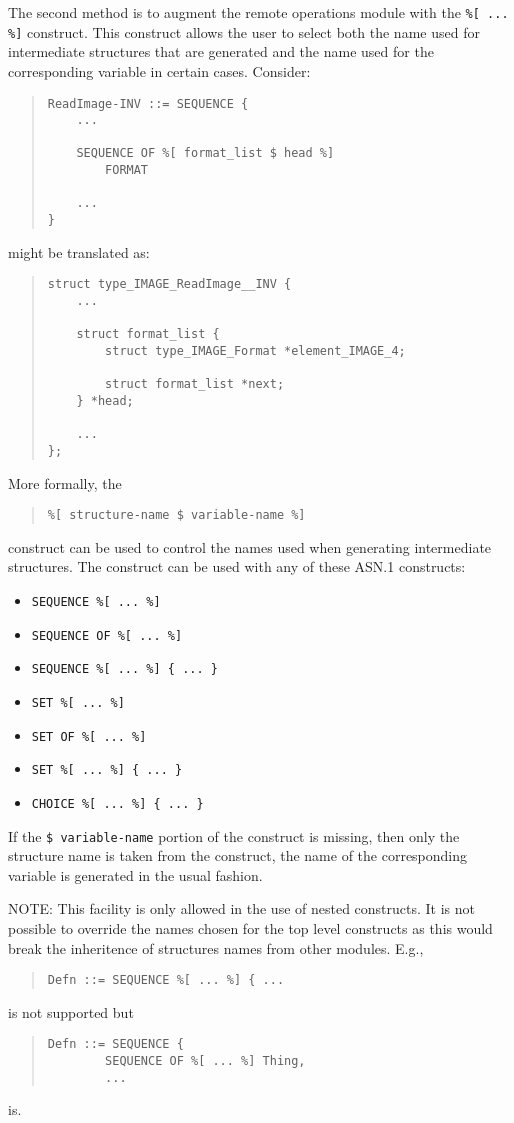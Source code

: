 The second method is to augment the remote operations module with the
\verb"%[ ... %]" construct.
This construct allows the user to select both the name used for
intermediate structures that are generated and the name used for the
corresponding variable in certain cases.
Consider:
\begin{quote}\small\begin{verbatim}
ReadImage-INV ::= SEQUENCE {
    ...

    SEQUENCE OF %[ format_list $ head %]
        FORMAT

    ...
}
\end{verbatim}\end{quote}
might be translated as:
\begin{quote}\small\begin{verbatim}
struct type_IMAGE_ReadImage__INV {
    ...

    struct format_list {
        struct type_IMAGE_Format *element_IMAGE_4;

        struct format_list *next;
    } *head;

    ...
};
\end{verbatim}\end{quote}
More formally,
the
\begin{quote}\small\begin{verbatim}
%[ structure-name $ variable-name %]
\end{verbatim}\end{quote}
construct can be used to control the names used when generating intermediate
structures.
The construct can be used with any of these ASN.1 constructs:
\begin{itemize}
\item	\verb"SEQUENCE %[ ... %]"
\item	\verb"SEQUENCE OF %[ ... %]"
\item	\verb"SEQUENCE %[ ... %] { ... }"
\item	\verb"SET %[ ... %]"
\item	\verb"SET OF %[ ... %]"
\item	\verb"SET %[ ... %] { ... }"
\item	\verb"CHOICE %[ ... %] { ... }"
\end{itemize}
If the \verb"$ variable-name" portion of the construct is missing,
then only the structure name is taken from the construct,
the name of the corresponding variable is generated in the usual fashion.

NOTE: This facility is only allowed in the use of nested constructs. It is
not possible to override the names chosen for the top level constructs as
this would break the inheritence of structures names from other modules.
E.g.,
\begin{quote}\small\begin{verbatim}
Defn ::= SEQUENCE %[ ... %] { ...
\end{verbatim}\end{quote}
is not supported but
\begin{quote}\small\begin{verbatim}
Defn ::= SEQUENCE {
        SEQUENCE OF %[ ... %] Thing,
        ...
\end{verbatim}\end{quote}
is.

